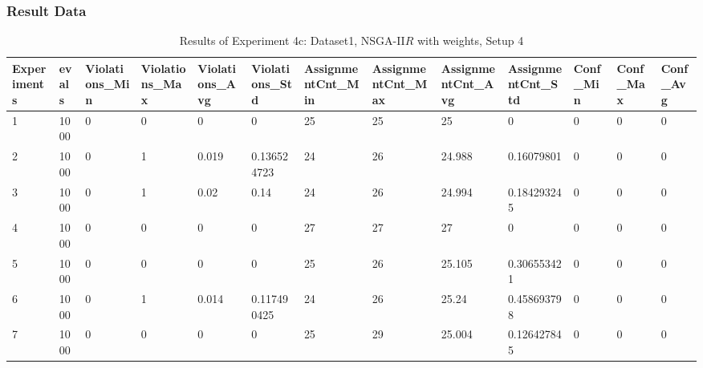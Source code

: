 		\subsubsection{Result Data}
		\label{sec:A_Exp4c_Data}
		\begin{table}[H]
			\caption{Results of Experiment 4c: Dataset1, NSGA-II$R$ with weights, Setup 4}
			\label{tab:A_Exp4c_Data}
			\begin{adjustbox}{max width=480pt,keepaspectratio,angle=90}
				\begin{tabular}{|l|l|l|l|l|l|l|l|l|l|l|l|l|}
					\hline
					\rowcolor[HTML]{EFEFEF} 
					Experiments & evals & Violations\_Min & Violations\_Max & Violations\_Avg & Violations\_Std & AssignmentCnt\_Min & AssignmentCnt\_Max & AssignmentCnt\_Avg & AssignmentCnt\_Std & Conf\_Min & Conf\_Max & Conf\_Avg \\ \hline
					1           & 1000  & 0               & 0               & 0               & 0               & 25                 & 25                 & 25                 & 0                  & 0         & 0         & 0         \\ \hline
					2           & 1000  & 0               & 1               & 0.019           & 0.136524723     & 24                 & 26                 & 24.988             & 0.16079801         & 0         & 0         & 0         \\ \hline
					3           & 1000  & 0               & 1               & 0.02            & 0.14            & 24                 & 26                 & 24.994             & 0.184293245        & 0         & 0         & 0         \\ \hline
					4           & 1000  & 0               & 0               & 0               & 0               & 27                 & 27                 & 27                 & 0                  & 0         & 0         & 0         \\ \hline
					5           & 1000  & 0               & 0               & 0               & 0               & 25                 & 26                 & 25.105             & 0.306553421        & 0         & 0         & 0         \\ \hline
					6           & 1000  & 0               & 1               & 0.014           & 0.117490425     & 24                 & 26                 & 25.24              & 0.458693798        & 0         & 0         & 0         \\ \hline
					7           & 1000  & 0               & 0               & 0               & 0               & 25                 & 29                 & 25.004             & 0.126427845        & 0         & 0         & 0         \\ \hline

\end{tabular}
\end{adjustbox}
\end{table}
